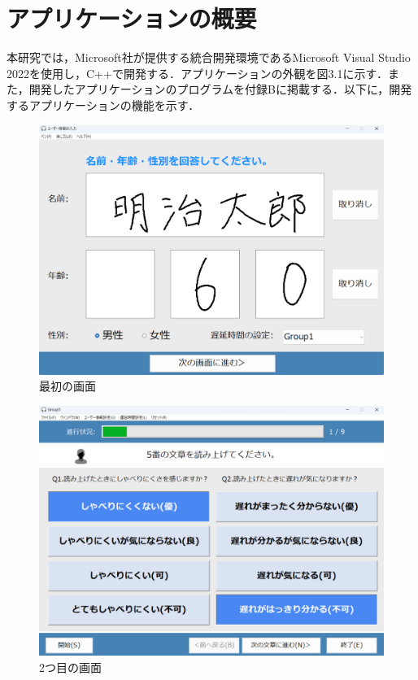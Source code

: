 \section{アプリケーションの概要}
本研究では，Microsoft社が提供する統合開発環境であるMicrosoft Visual Studio 2022を使用し，C++で開発する．アプリケーションの外観を図3.1に示す．また，開発したアプリケーションのプログラムを付録Bに掲載する．以下に，開発するアプリケーションの機能を示す．
\begin{figure}[tbp]
  \centering
  \includegraphics[scale=0.25]{figures/Syukann/gamen_1.png}
  \caption{最初の画面}
\end{figure}
\begin{figure}[tbp]
  \centering
  \includegraphics[scale=0.25]{figures/Syukann/app_2.png}
  \caption{2つ目の画面}
\end{figure}
